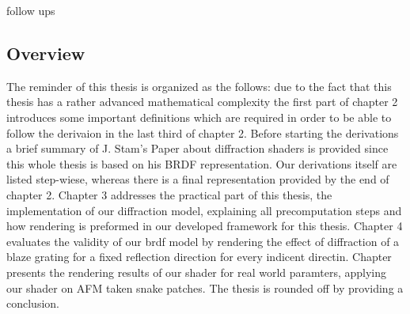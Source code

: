 follow ups


\subsection{Overview}
The reminder of this thesis is organized as the follows: due to the fact that this thesis has a rather advanced mathematical complexity the first part of chapter 2 introduces some important definitions which are required in order to be able to follow the derivaion in the last third of chapter 2. Before starting the derivations a brief summary of J. Stam's Paper about diffraction shaders is provided since this whole thesis is based on his BRDF representation. Our derivations itself are listed step-wiese, whereas there is a final representation provided by the end of chapter 2. Chapter 3 addresses the practical part of this thesis, the implementation of our diffraction model, explaining all precomputation steps and how rendering is preformed in our developed framework for this thesis. Chapter 4 evaluates the validity of our brdf model by rendering the effect of diffraction of a blaze grating for a fixed reflection direction for every indicent directin. Chapter presents the rendering results of our shader for real world paramters, applying our shader on AFM taken snake patches. The thesis is rounded off by providing a conclusion.    


